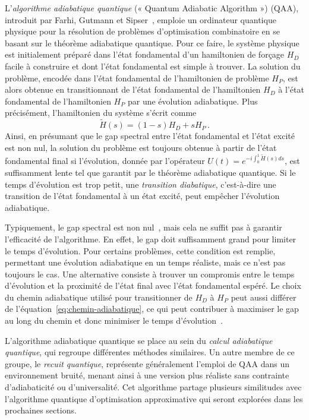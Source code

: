 L'\textit{algorithme adiabatique quantique} (« Quantum Adiabatic Algorithm ») (QAA), introduit par Farhi, Gutmann et Sipser~\cite{farhiQuantumComputationAdiabatic2000}, emploie un ordinateur quantique physique pour la résolution de problèmes d'optimisation combinatoire en se basant sur le théorème adiabatique quantique. Pour ce faire, le système physique est initialement préparé dans l'état fondamental d'un hamiltonien de forçage $H_{D}$ facile à construire et dont l'état fondamental est simple à trouver. La solution du problème, encodée dans l'état fondamental de l'hamiltonien de problème $H_{P}$, est alors obtenue en transitionnant de l'état fondamental de l'hamiltonien $H_{D}$ à l'état fondamental de l'hamiltonien $H_{P}$ par une évolution adiabatique. Plus précisément, l'hamiltonien du système s'écrit comme
\begin{equation}
\label{eq:chemin-adiabatique}    
    \tilde{H}(s) = \left(1-s\right) H_{D} + s H_{P} \,.
\end{equation}
Ainsi, en présumant que le gap spectral entre l'état fondamental et l'état excité est non nul, la solution du problème est toujours obtenue à partir de l'état fondamental final si l'évolution, donnée par l'opérateur $U(t) = e^{-i \int_{0}^{1} \tilde{H}(s) ds}$, est suffisamment lente tel que garantit par le théorème adiabatique quantique. Si le temps d'évolution est trop petit, une \textit{transition diabatique}, c'est-à-dire une transition de l'état fondamental à un état excité, peut empêcher l'évolution adiabatique.

Typiquement, le gap spectral est non nul~\cite{farhiQuantumComputationAdiabatic2000}, mais cela ne suffit pas à garantir l'efficacité de l'algorithme. En effet, le gap doit suffisamment grand pour limiter le temps d'évolution. Pour certains problèmes, cette condition est remplie, permettant une évolution adiabatique en un temps réaliste, mais ce n'est pas toujours le cas\cite{altshulerAndersonLocalizationMakes2010}. Une alternative consiste à trouver un compromis entre le temps d'évolution et la proximité de l'état final avec l'état fondamental espéré. Le choix du chemin adiabatique utilisé pour transitionner de $H_{D}$ à $H_{P}$ peut aussi différer de l'équation~\ref{eq:chemin-adiabatique}, ce qui peut contribuer à maximiser le gap au long du chemin et donc minimiser le temps d'évolution~\cite{nishimoriExponentialEnhancementEfficiency2017, hormoziNonstoquasticHamiltoniansQuantum2017}.

L'algorithme adiabatique quantique se place au sein du \textit{calcul adiabatique quantique}, qui regroupe différentes méthodes similaires. Un autre membre de ce groupe, le \textit{recuit quantique}, représente généralement l'emploi de QAA dans un environnement bruité, menant ainsi à une version plus réaliste sans contrainte d'adiabaticité ou d'universalité. Cet algorithme partage plusieurs similitudes avec l'algorithme quantique d'optimisation approximative qui seront explorées dans les prochaines sections. 

